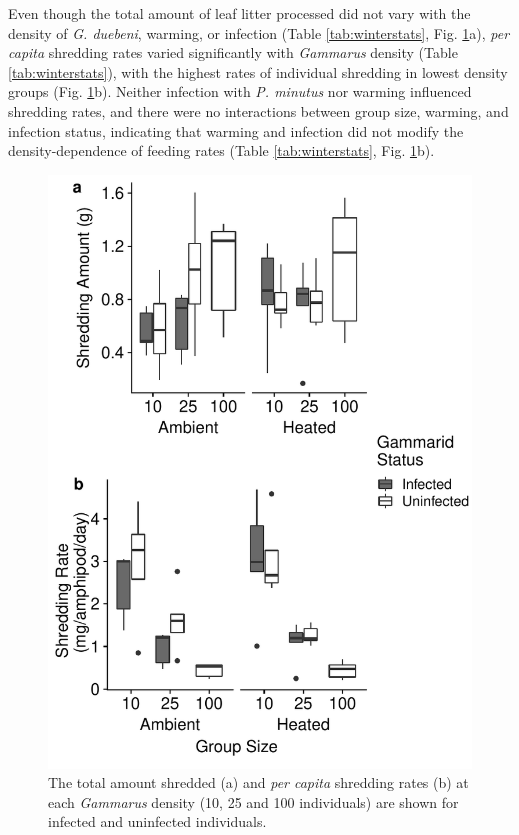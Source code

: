 Even though the total amount of leaf litter processed did not vary with the density of \emph{G. duebeni}, warming, or infection (Table \ref{tab:winterstats}, Fig. \ref{fig:wintershred}a), \emph{per capita} shredding rates varied significantly with \emph{Gammarus} density (Table \ref{tab:winterstats}), with the highest rates of individual shredding in lowest density groups (Fig. \ref{fig:wintershred}b). Neither infection with \emph{P. minutus} nor warming influenced shredding rates, and there were no interactions between group size, warming, and infection status, indicating that warming and infection did not modify the density-dependence of feeding rates (Table \ref{tab:winterstats}, Fig. \ref{fig:wintershred}b).  

\begin{figure}[H]
    \centering
    \includegraphics[keepaspectratio,scale=0.9]{figures/ch5/wintershred.pdf}
  \caption [Density dependence of shredding rates of \emph{G. duebeni} at ambient and warmed temperatures in the field.]{The total amount shredded (a) and \emph{per capita} shredding rates (b) at each \emph{Gammarus} density (10, 25 and 100 individuals) are shown for infected and uninfected individuals.} 
    \label{fig:wintershred}
\end{figure}

